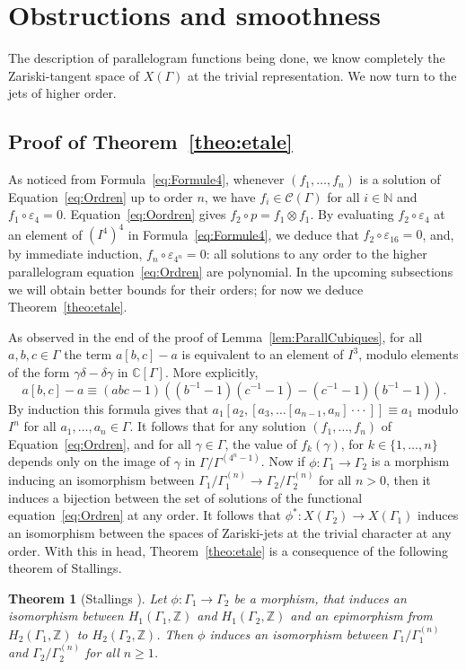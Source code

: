 \documentclass[JEP,XML,SOM,Unicode,NoEqCountersInSection]{cedram}
\let\mathcal\mathscr
\newtheorem{theorem}{Theorem}[section]
\theoremstyle{definition}
\newcommand{\ZZ}{\mathbb{Z}}
\newcommand{\NN}{\mathbb{N}}
\newcommand{\CC}{\mathbb{C}}
\begin{document}
\section{Obstructions and smoothness}

The description of parallelogram functions being done, we know completely
the Zariski-tangent space of $X(\Gamma)$ at the trivial representation.
We now turn to the jets of higher order.

\subsection{Proof of Theorem~\ref{theo:etale}}
As noticed from Formula~\eqref{eq:Formule4}, whenever $(f_1,\ldots,f_n)$
is a solution of Equation~\eqref{eq:Ordren} up to order $n$, we have
$f_i\in \mathcal{C}(\Gamma)$ for all $i\in\NN$ and $f_1\circ\varepsilon_4=0$.
Equation~\eqref{eq:Oordren} gives $f_2\circ p= f_1\otimes f_1$.
By evaluating $f_2\circ\varepsilon_4$ at
an element of $(I^4)^4$ in Formula~\eqref{eq:Formule4},
we deduce that $f_2\circ\varepsilon_{16}=0$, and,
by immediate induction, $f_n\circ\varepsilon_{4^n}=0$: all solutions to
any order to the higher parallelogram equation~\eqref{eq:Ordren} are
polynomial. In the upcoming subsections we will obtain better bounds for
their orders; for now we deduce Theorem~\ref{theo:etale}.

As observed in the end of the proof of Lemma~\ref{lem:ParallCubiques},
for all
$a,b,c\in\Gamma$ the term $a[b,c]-a$ is equivalent to an element of $I^3$,
modulo elements of the form $\gamma\delta-\delta\gamma$ in $\CC[\Gamma]$.
More explicitly,
\[ a[b,c] - a \equiv
(abc-1)\left((b^{-1}-1)(c^{-1}-1)-(c^{-1}-1)(b^{-1}-1)\right). \]
By induction this formula gives that $a_1[a_2,[a_3,\dots[a_{n-1},a_n]\cdot\cdot\cdot]]\equiv a_1$ modulo $I^n$ for all $a_1,\ldots,a_n\in\Gamma$. It follows that for any solution $(f_1,\ldots,f_n)$ of
Equation~\eqref{eq:Ordren}, and for all $\gamma\in\Gamma$, the value of
$f_k(\gamma)$, for $k\in\{1,\ldots,n\}$ depends only on the image of
$\gamma$ in $\Gamma/\Gamma^{(4^n-1)}$. Now if
$\phi\colon\Gamma_1\to\Gamma_2$ is a morphism inducing an isomorphism
between $\Gamma_1/\Gamma_1^{(n)}\to \Gamma_2/\Gamma_2^{(n)}$ for all $n>0$,
then it induces a bijection between the set of solutions of the functional
equation~\eqref{eq:Ordren} at any order. It follows that
$\phi^*:X(\Gamma_2)\to X(\Gamma_1)$ induces an isomorphism between the
spaces of Zariski-jets at the trivial character at any order. With this in
head, Theorem~\ref{theo:etale} is a consequence of the following theorem of Stallings.
\begin{theorem}[{Stallings \cite[Th.\,3.4]{Stallings}}]
Let $\phi\colon \Gamma_1\to \Gamma_2$ be a morphism, that induces an
isomorphism between $H_1(\Gamma_1,\ZZ)$ and $H_1(\Gamma_2,\ZZ)$ and an
epimorphism from $H_2(\Gamma_1,\ZZ)$ to $H_2(\Gamma_2,\ZZ)$.
Then $\phi$ induces an isomorphism between
$\Gamma_1/\Gamma_1^{(n)}$ and $\Gamma_2/\Gamma_2^{(n)}$ for all
$n\geq 1$.
\end{theorem}
\end{document}

